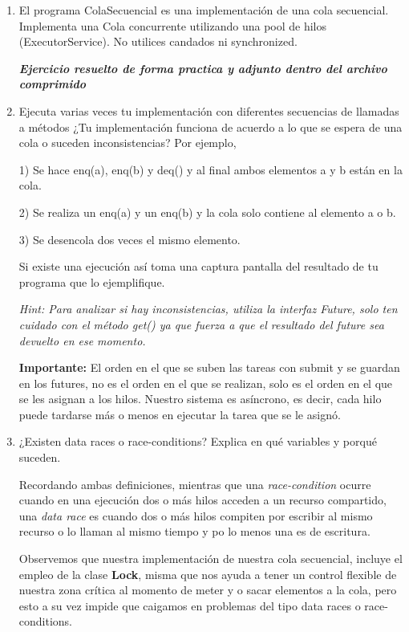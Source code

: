 \begin{enumerate}

\item El programa ColaSecuencial es una implementación de una cola secuencial. Implementa una Cola concurrente utilizando una pool de hilos (ExecutorService). No utilices candados ni synchronized.

\textbf{\textit{Ejercicio resuelto de forma practica y adjunto dentro del archivo comprimido}}

\hfill

\item Ejecuta varias veces tu implementación con diferentes secuencias de llamadas a métodos ¿Tu implementación funciona de acuerdo a lo que se espera de una cola o suceden inconsistencias? Por ejemplo,

1) Se hace enq(a), enq(b) y deq() y al final ambos elementos a y b están en la cola.

2) Se realiza un enq(a) y un enq(b) y la cola solo contiene al elemento a o b.

3) Se desencola dos veces el mismo elemento.

Si existe una ejecución así toma una captura pantalla del resultado de tu programa que lo ejemplifique.

\hfill

\textit{Hint: Para analizar si hay inconsistencias, utiliza la interfaz Future, solo ten cuidado con el método get() ya que fuerza a que el resultado del future sea devuelto en ese momento.}

\hfill

\textbf{Importante:} El orden en el que se suben las tareas con submit y se guardan en los futures, no es el orden en el que se realizan, solo es el orden en el que se les asignan a los hilos. Nuestro sistema es asíncrono, es decir, cada hilo puede tardarse más o menos en ejecutar la tarea que se le asignó.

\hfill

\item ¿Existen data races o race-conditions? Explica en qué variables y porqué suceden.

Recordando ambas definiciones, mientras que una \textit{race-condition} ocurre cuando en una ejecución dos o más hilos acceden a un recurso compartido, una \textit{data race} es cuando dos o más hilos compiten por escribir al mismo recurso o lo llaman al mismo tiempo y po lo menos una es de escritura.

Observemos que nuestra implementación de nuestra cola secuencial, incluye el empleo de la clase \textbf{Lock}, misma que nos ayuda a tener un control flexible de nuestra zona crítica al momento de meter y o sacar elementos a la cola, pero esto a su vez impide que caigamos en problemas del tipo data races o race-conditions.


\end{enumerate}
